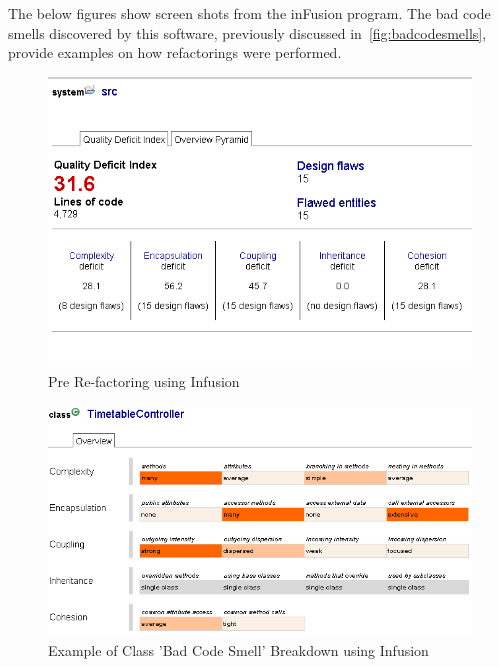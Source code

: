 The below figures show screen shots from the inFusion program. The bad code smells discovered by this software, previously discussed in~\ref{fig:badcodesmells}, provide examples on how refactorings were performed. 

\begin{figure}[H]
\begin{center}
\includegraphics[scale=0.7]{infusion1.PNG}
\end{center}
\caption{Pre Re-factoring using Infusion}
\label{fig:infusion1}
\end{figure}

\begin{figure} [H]
\begin{center}
\includegraphics[scale=0.7]{infusion3.PNG}
\caption{Example of Class 'Bad Code Smell' Breakdown using Infusion}
\end{center}
\end{figure}

